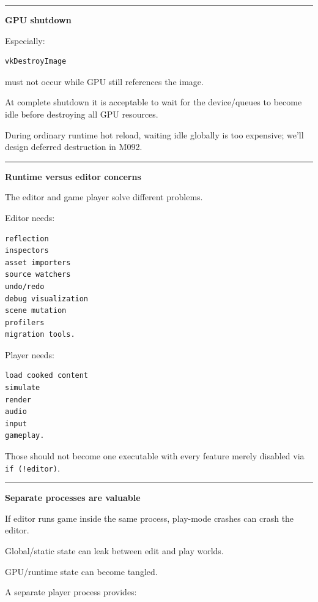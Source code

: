 \begin{center}\rule{0.5\linewidth}{0.5pt}\end{center}

\textbf{GPU shutdown}

Especially:

\begin{verbatim}
vkDestroyImage
\end{verbatim}

must not occur while GPU still references the image.

At complete shutdown it is acceptable to wait for the device/queues to become idle before destroying all GPU resources.

During ordinary runtime hot reload, waiting idle globally is too expensive; we'll design deferred destruction in M092.

\begin{center}\rule{0.5\linewidth}{0.5pt}\end{center}

\textbf{Runtime versus editor concerns}

The editor and game player solve different problems.

Editor needs:

\begin{verbatim}
reflection
inspectors
asset importers
source watchers
undo/redo
debug visualization
scene mutation
profilers
migration tools.
\end{verbatim}

Player needs:

\begin{verbatim}
load cooked content
simulate
render
audio
input
gameplay.
\end{verbatim}

Those should not become one executable with every feature merely disabled via \texttt{if\ (!editor)}.

\begin{center}\rule{0.5\linewidth}{0.5pt}\end{center}

\textbf{Separate processes are valuable}

If editor runs game inside the same process, play-mode crashes can crash the editor.

Global/static state can leak between edit and play worlds.

GPU/runtime state can become tangled.

A separate player process provides:

